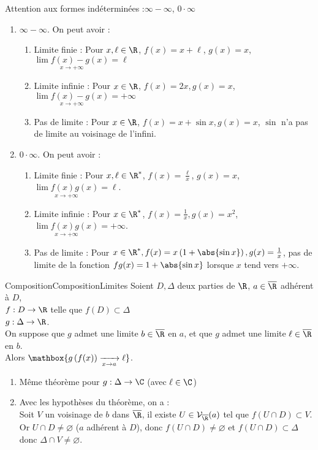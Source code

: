 \documentclass[12pt,a4paper]{report}
\begin{document}
\begin{remarque}
Attention aux formes indéterminées :$\infty - \infty$, $0 \cdot \infty$
\begin{enumerate}
	\item $\infty-\infty$.
		On peut avoir : 
		\begin{enumerate}
			\item Limite finie : Pour $x, \ell \in \R$, $f(x) = x+\ell$, $g(x) = x$, $\underset{x \to +\infty}{\lim f(x)-g(x)}=\ell$
			\item Limite infinie : Pour $x \in \R$, $f(x) = 2x, g(x) = x$, $\underset{x \to +\infty}{\lim f(x)-g(x)}=+\infty$
			\item Pas de limite : Pour $x \in \R$, $f(x) = x+\sin x, g(x) = x$, $\sin$ n'a pas de limite au voisinage de l'infini.
		\end{enumerate}
	\item $0 \cdot \infty$.
		On peut avoir : 
		\begin{enumerate}
			\item Limite finie : Pour $x,\ell \in \R^*$, $f(x) = \frac{\ell}{x}$, $g(x) = x$, $\underset{x \to +\infty}{\lim f(x)g(x)} = \ell$.
			\item Limite infinie : Pour $x \in \R^*$, $f(x) = \frac{1}{x}, g(x) = x^2$, $\underset{x \to +\infty}{\lim f(x)g(x)} = +\infty$.
			\item Pas de limite : Pour $x \in \R^*, f(x) = x\left(1+\abs{\sin x}\right), g(x) = \frac{1}{x}$, pas de limite de la fonction $fg(x) = 1+\abs{\sin x}$ lorsque $x$ tend vers $+\infty$.
		\end{enumerate}
\end{enumerate}
\end{remarque}

\begin{theoreme}{Composition}{CompositionLimites}
Soient $D,\Delta$ deux parties de $\R$, $a \in \overline{\R}$ adhérent à $D$, \\
$f : D \to \R$ telle que $f(D) \subset \Delta$ \\
$g : \Delta \to \R$. \\
On suppose que $g$ admet une limite $b \in \overline{\R}$ en $a$, et que $g$ admet une limite $\ell \in \overline{\R}$ en $b$. \\
Alors $\mathbox{g\left(f(x)\right) \xrightarrow[x \to a]{} \ell}$.
\end{theoreme}

\begin{remarque}
\begin{enumerate}
	\item Même théorème pour $g : \Delta \to \C$ (avec $\ell \in \C$)
	\item Avec les hypothèses du théorème, on a  : \\
		Soit $V$ un voisinage de $b$ dans $\overline{\R}$, il existe $U \in \mathcal{V}_{\overline{\R}}(a)$ tel que $f(U \cap D) \subset V$. \\
		Or $U \cap D \neq \varnothing$ ($a$ adhérent à $D$), donc $f(U \cap D) \neq \varnothing$ et $f(U \cap D) \subset \Delta$ donc $\Delta \cap V \neq \varnothing$.
\end{enumerate}
\end{remarque}
\end{document}
